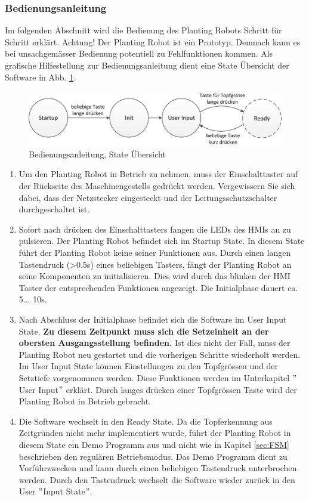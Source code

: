 \subsubsection{Bedienungsanleitung}
Im folgenden Abschnitt wird die Bedienung des Planting Robots Schritt für Schritt erklärt. Achtung! Der Planting Robot ist ein Prototyp. Demnach kann es bei unsachgemässer Bedienung potentiell zu Fehlfunktionen kommen. Als grafische Hilfestellung zur Bedienungsanleitung dient eine State Übersicht der Software in Abb. \ref{fig:Bedienungsanleitung}.

\begin{figure}[H]
	\includegraphics[width=1\textwidth]{Illustrationen/6-Umsetzung/Bedienungsanleitung.png}
	\caption{Bedienungsanleitung, State Übersicht}
	\label{fig:Bedienungsanleitung}
\end{figure}

\begin{enumerate}
	\item Um den Planting Robot in Betrieb zu nehmen, muss der Einschalttaster auf der Rückseite des Maschinengestells gedrückt werden. Vergewissern Sie sich dabei, dass der Netzstecker eingesteckt und der Leitungsschutzschalter durchgeschaltet ist.
	\item Sofort nach drücken des Einschalttasters fangen die LEDs des HMIs an zu pulsieren. Der Planting Robot befindet sich im Startup State. In diesem State führt der Planting Robot keine seiner Funktionen aus. Durch einen langen Tastendruck (>0.5s) eines beliebigen Tasters, fängt der Planting Robot an seine Komponenten zu initialisieren. Dies wird durch das blinken der HMI Taster der entsprechenden Funktionen angezeigt. Die Initialphase dauert ca. 5... 10s.
	\item Nach Abschluss der Initialphase befindet sich die Software im User Input State. \textbf{Zu diesem Zeitpunkt muss sich die Setzeinheit an der obersten Ausgangsstellung befinden.} Ist dies nicht der Fall, muss der Planting Robot neu gestartet und die vorherigen Schritte wiederholt werden. Im User Input State können Einstellungen zu den Topfgrössen und der Setztiefe vorgenommen werden. Diese Funktionen werden im Unterkapitel $"$User Input$"$ erklärt. Durch langes drücken einer Topfgrössen Taste wird der Planting Robot in Betrieb gebracht.
	\item Die Software wechselt in den Ready State. Da die Topferkennung aus Zeitgründen nicht mehr implementiert wurde, führt der Planting Robot in diesem State ein Demo Programm aus und nicht wie in Kapitel \ref{sec:FSM} beschrieben den regulären Betriebsmodus. Das Demo Programm dient zu Vorführzwecken und kann durch einen beliebigen Tastendruck unterbrochen werden. Durch den Tastendruck wechselt die Software wieder zurück in den User $"$Input State$"$.
\end{enumerate}


